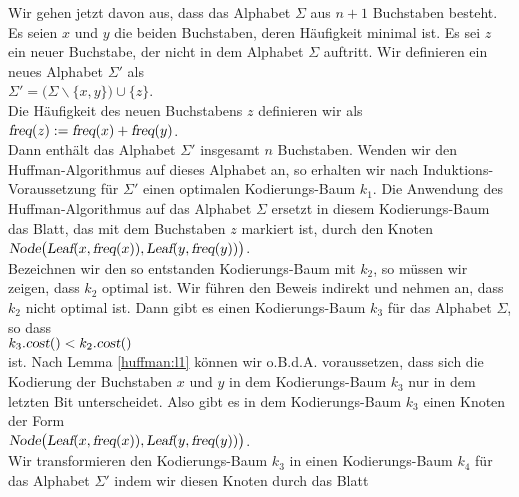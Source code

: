 \begin{enumerate}
  Wir gehen jetzt davon aus, dass das Alphabet $\Sigma$ aus $n+1$ Buchstaben besteht.
  Es seien $x$ und $y$ die beiden Buchstaben, deren H\"aufigkeit minimal ist.
  Es sei $z$ ein neuer Buchstabe, der nicht in dem Alphabet $\Sigma$ auftritt.  Wir definieren
  ein neues Alphabet $\Sigma'$ als
  \\[0.2cm]
  \hspace*{1.3cm}
  $\Sigma' = \bigl(\Sigma \backslash \{x,y\}\bigr) \cup \{z\}$.
  \\[0.2cm]
  Die H\"aufigkeit des neuen Buchstabens $z$ definieren wir als 
  \\[0.2cm]
  \hspace*{1.3cm}
  $\textsl{freq}(z) := \textsl{freq}(x) + \textsl{freq}(y)$.
  \\[0.2cm]
  Dann enth\"alt das Alphabet $\Sigma'$ insgesamt $n$ Buchstaben.  Wenden wir den Huffman-Algorithmus
  auf dieses Alphabet an, so erhalten wir nach Induktions-Voraussetzung f\"ur $\Sigma'$ einen optimalen
  Kodierungs-Baum $k_1$.  Die Anwendung des Huffman-Algorithmus auf das Alphabet $\Sigma$ ersetzt in diesem
  Kodierungs-Baum das Blatt, das mit dem Buchstaben $z$ markiert ist, durch den Knoten 
  \\[0.2cm]
  \hspace*{1.3cm}
  $\textsl{Node}\bigl(\textsl{Leaf}(x, \textsl{freq}(x)), \textsl{Leaf}(y,\textsl{freq}(y))\bigr)$.
  \\[0.2cm]
  Bezeichnen wir den so entstanden Kodierungs-Baum mit $k_2$, so m\"ussen wir zeigen, dass $k_2$ optimal
  ist.  Wir f\"uhren den Beweis indirekt und nehmen an, dass $k_2$ nicht optimal ist. Dann gibt es einen
  Kodierungs-Baum $k_3$ f\"ur das Alphabet $\Sigma$, so dass 
  \\[0.2cm]
  \hspace*{1.3cm}
  $k_3.\textsl{cost}() < k_2.\textsl{cost}()$
  \\[0.2cm]
  ist.  Nach Lemma \ref{huffman:l1} k\"onnen wir o.B.d.A. voraussetzen, dass sich die Kodierung der 
  Buchstaben $x$ und $y$ in dem Kodierungs-Baum $k_3$ nur in dem letzten Bit
  unterscheidet.  Also gibt es in dem Kodierungs-Baum $k_3$ einen Knoten der Form
  \\[0.2cm]
  \hspace*{1.3cm}
  $\textsl{Node}\bigl(\textsl{Leaf}(x, \textsl{freq}(x)), \textsl{Leaf}(y,\textsl{freq}(y))\bigr)$.
  \\[0.2cm]
  Wir transformieren den Kodierungs-Baum $k_3$ in einen Kodierungs-Baum $k_4$ f\"ur das Alphabet $\Sigma'$ indem
  wir diesen Knoten durch das Blatt

\end{enumerate}
